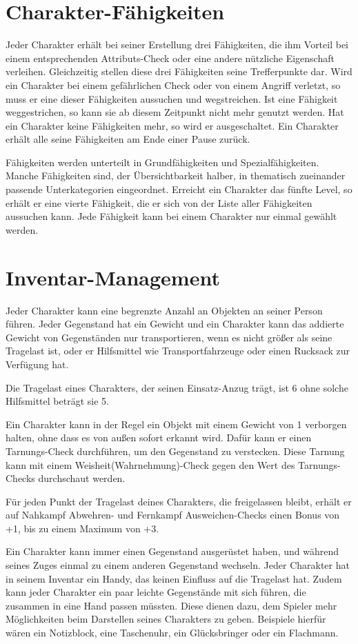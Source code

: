\section{Charakter-Fähigkeiten}
Jeder Charakter erhält bei seiner Erstellung drei Fähigkeiten, die ihm Vorteil bei einem entsprechenden Attributs-Check oder eine andere nützliche Eigenschaft verleihen. Gleichzeitig stellen diese drei Fähigkeiten seine Trefferpunkte dar. Wird ein Charakter bei einem gefährlichen Check oder von einem Angriff verletzt, so muss er eine dieser Fähigkeiten aussuchen und wegstreichen. Ist eine Fähigkeit weggestrichen, so kann sie ab diesem Zeitpunkt nicht mehr genutzt werden. Hat ein Charakter keine Fähigkeiten mehr, so wird er ausgeschaltet. Ein Charakter erhält alle seine Fähigkeiten am Ende einer Pause zurück.

Fähigkeiten werden unterteilt in Grundfähigkeiten und Spezialfähigkeiten. Manche Fähigkeiten sind, der Übersichtbarkeit halber, in thematisch zueinander passende Unterkategorien eingeordnet.
Erreicht ein Charakter das fünfte Level, so erhält er eine vierte Fähigkeit, die er sich von der Liste aller Fähigkeiten aussuchen kann.
Jede Fähigkeit kann bei einem Charakter nur einmal gewählt werden.
\section{Inventar-Management}
Jeder Charakter kann eine begrenzte Anzahl an Objekten an seiner Person führen. Jeder Gegenstand hat ein Gewicht und ein Charakter kann das addierte Gewicht von Gegenständen nur transportieren, wenn es nicht größer als seine Tragelast ist, oder er Hilfsmittel wie Transportfahrzeuge oder einen Rucksack zur Verfügung hat.

Die Tragelast eines Charakters, der seinen Einsatz-Anzug trägt, ist 6 ohne solche Hilfsmittel beträgt sie 5.

Ein Charakter kann in der Regel ein Objekt mit einem Gewicht von 1 verborgen halten, ohne dass es von außen sofort erkannt wird. Dafür kann er einen Tarnungs-Check durchführen, um den Gegenstand zu verstecken. Diese Tarnung kann mit einem Weisheit(Wahrnehmung)-Check gegen den Wert des Tarnungs-Checks durchschaut werden.

Für jeden Punkt der Tragelast deines Charakters, die freigelassen bleibt, erhält er auf Nahkampf Abwehren- und Fernkampf Ausweichen-Checks einen Bonus von +1, bis zu einem Maximum von +3.

Ein Charakter kann immer einen Gegenstand ausgerüstet haben, und während seines Zuges einmal zu einem anderen Gegenstand wechseln.
Jeder Charakter hat in seinem Inventar ein Handy, das keinen Einfluss auf die Tragelast hat. Zudem kann jeder Charakter ein paar leichte Gegenstände mit sich führen, die zusammen in eine Hand passen müssten. Diese dienen dazu, dem Spieler mehr Möglichkeiten beim Darstellen seines Charakters zu geben. Beispiele hierfür wären ein Notizblock, eine Taschenuhr, ein Glücksbringer oder ein Flachmann.

